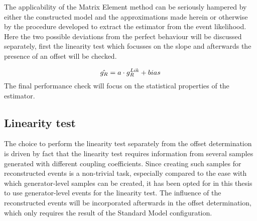 The applicability of the Matrix Element method can be seriously hampered by either the constructed model and the approximations made herein or otherwise by the procedure developed to extract the estimator from the event likelihood.
Here the two possible deviations from the perfect behaviour will be discussed separately, first the linearity test which focusses on the slope and afterwards the presence of an offset will be checked.

\begin{equation}
 \hat{g_R} = a \cdot g_{R}^{Lik} + bias
\end{equation}
The final performance check will focus on the statistical properties of the estimator.

\subsection{Linearity test}

The choice to perform the linearity test separately from the offset determination is driven by fact that the linearity test requires information from several samples generated with different coupling coefficients. Since creating such samples for reconstructed events is a non-trivial task, especially compared to the ease with which generator-level samples can be created, it has been opted for in this thesis to use generator-level events for the linearity test.
The influence of the reconstructed events will be incorporated afterwards in the offset determination, which only requires the result of the Standard Model configuration.
\\


